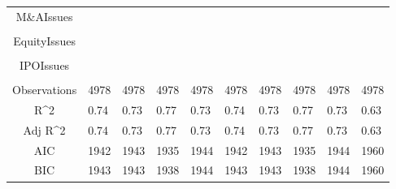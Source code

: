 \documentclass{article}
\begin{document}
\begin{table}[H]
\begin{tabular}{|clllllllll|}
  M\&AIssues &  &  &  &  &  &  &  &  &  \\ 
   &  &  &  &  &  &  &  &  &  \\ 
  EquityIssues &  &  &  &  &  &  &  &  &  \\ 
   &  &  &  &  &  &  &  &  &  \\ 
  IPOIssues &  &  &  &  &  &  &  &  &  \\ 
   &  &  &  &  &  &  &  &  &  \\ 
  \hline 
 Observations & 4978 & 4978 & 4978 & 4978 & 4978 & 4978 & 4978 & 4978 & 4978 \\ 
  R^2 & 0.74 & 0.73 & 0.77 & 0.73 & 0.74 & 0.73 & 0.77 & 0.73 & 0.63 \\ 
  Adj R^2 & 0.74 & 0.73 & 0.77 & 0.73 & 0.74 & 0.73 & 0.77 & 0.73 & 0.63 \\ 
  AIC & 1942 & 1943 & 1935 & 1944 & 1942 & 1943 & 1935 & 1944 & 1960 \\ 
  BIC & 1943 & 1943 & 1938 & 1944 & 1943 & 1943 & 1938 & 1944 & 1960 \\ 
   \hline
\end{tabular}
 
\end{table}
\end{document}
